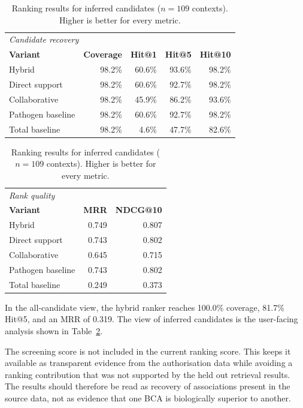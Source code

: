 \begin{table}[H]
    \caption{Ranking results for inferred candidates ($n=109$ contexts). Higher is better for every metric.}
    \label{tab:ranking-results}
    \centering
    \small
    \setlength{\tabcolsep}{3pt}
    \renewcommand{\arraystretch}{1.15}
    \begin{tabular}{lrrrr}
        \hline
        \multicolumn{5}{l}{\textit{Candidate recovery}}                                           \\
        \textbf{Variant}  & \textbf{Coverage} & \textbf{Hit@1} & \textbf{Hit@5} & \textbf{Hit@10} \\
        \hline
        Hybrid            & 98.2\%            & 60.6\%         & 93.6\%         & 98.2\%          \\
        Direct support    & 98.2\%            & 60.6\%         & 92.7\%         & 98.2\%          \\
        Collaborative     & 98.2\%            & 45.9\%         & 86.2\%         & 93.6\%          \\
        Pathogen baseline & 98.2\%            & 60.6\%         & 92.7\%         & 98.2\%          \\
        Total baseline    & 98.2\%            & 4.6\%          & 47.7\%         & 82.6\%          \\
        \hline
    \end{tabular}
    \vspace{3pt}
    \begin{tabular}{lrr}
        \hline
        \multicolumn{3}{l}{\textit{Rank quality}}           \\
        \textbf{Variant}  & \textbf{MRR} & \textbf{NDCG@10} \\
        \hline
        Hybrid            & 0.749        & 0.807            \\
        Direct support    & 0.743        & 0.802            \\
        Collaborative     & 0.645        & 0.715            \\
        Pathogen baseline & 0.743        & 0.802            \\
        Total baseline    & 0.249        & 0.373            \\
        \hline
    \end{tabular}
\end{table}

In the all-candidate view, the hybrid ranker reaches 100.0\% coverage, 81.7\% Hit@5, and an MRR of 0.319. The
view of inferred candidates is the user-facing analysis shown in Table~\ref{tab:ranking-results}.

The screening score is not included in the current ranking score. This keeps it available as transparent
evidence from the authorisation data while avoiding a ranking contribution that was not supported by the held out
retrieval results. The results should therefore be read as recovery of associations present in the source data,
not as evidence that one BCA is biologically superior to another.
